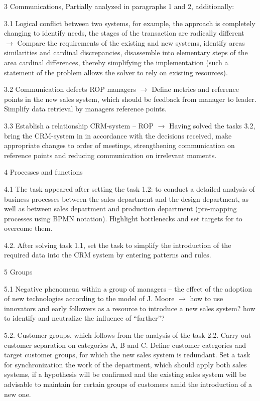 \documentclass[11pt,a4paper]{book}
\begin{document}
3 Communications, Partially analyzed in paragraphs 1 and 2, additionally:

3.1 Logical conflict between two systems, for example, the approach is
completely changing to identify needs, the stages of the transaction are
radically different $\to$ Compare the requirements of the existing and new
systems, identify areas similarities and cardinal discrepancies, disassemble
into elementary steps of the area cardinal differences, thereby simplifying
the implementation (such a statement of the problem allows the solver to rely
on existing resources).

3.2 Communication defects ROP managers $\to$ Define metrics and reference
points in the new sales system, which should be feedback from manager to
leader. Simplify data retrieval by managers reference points.

3.3 Establish a relationship CRM-system -- ROP $\to$ Having solved the tasks
3.2, bring the CRM-system in in accordance with the decisions received, make
appropriate changes to order of meetings, strengthening communication on
reference points and reducing communication on irrelevant moments.

4 Processes and functions

4.1 The task appeared after setting the task 1.2: to conduct a detailed
analysis of business processes between the sales department and the design
department, as well as between sales department and production department
(pre-mapping processes using BPMN notation). Highlight bottlenecks and set
targets for to overcome them.

4.2.  After solving task 1.1, set the task to simplify the introduction of the
required data into the CRM system by entering patterns and rules.

5 Groups

5.1 Negative phenomena within a group of managers -- the effect of the
adoption of new technologies according to the model of J. Moore $\to$ how to
use innovators and early followers as a resource to introduce a new sales
system? how to identify and neutralize the influence of “farther”?

5.2.  Customer groups, which follows from the analysis of the task 2.2. Carry
out customer separation on categories A, B and C. Define customer categories
and target customer groups, for which the new sales system is redundant. Set a
task for synchronization the work of the department, which should apply both
sales systems, if a hypothesis will be confirmed and the existing sales system
will be advisable to maintain for certain groups of customers amid the
introduction of a new one.
\end{document}
